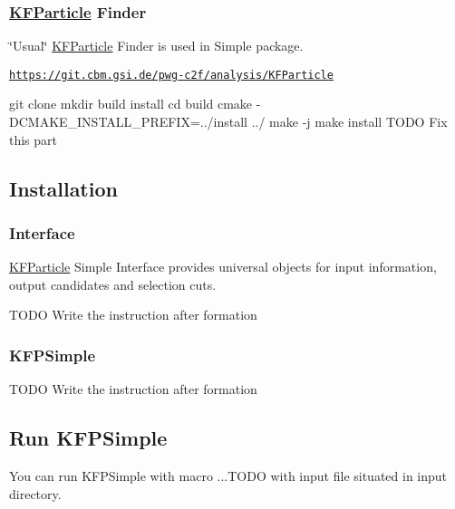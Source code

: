 \subsubsection*{\hyperlink{classKFParticle}{K\+F\+Particle} Finder}

\char`\"{}\+Usual\char`\"{} \hyperlink{classKFParticle}{K\+F\+Particle} Finder is used in Simple package.

\href{https://git.cbm.gsi.de/pwg-c2f/analysis/KFParticle}{\tt https\+://git.\+cbm.\+gsi.\+de/pwg-\/c2f/analysis/\+K\+F\+Particle} \begin{DoxyVerb}git clone
mkdir build install
cd build
cmake -DCMAKE_INSTALL_PREFIX=../install ../
make -j
make install                              TODO Fix this part
\end{DoxyVerb}


\subsection*{Installation}

\subsubsection*{Interface}

\hyperlink{classKFParticle}{K\+F\+Particle} Simple Interface provides universal objects for input information, output candidates and selection cuts. \begin{DoxyVerb}                                          TODO Write the instruction after formation
\end{DoxyVerb}


\subsubsection*{K\+F\+P\+Simple}

\begin{DoxyVerb}                                          TODO Write the instruction after formation
\end{DoxyVerb}


\subsection*{Run K\+F\+P\+Simple}

You can run K\+F\+P\+Simple with macro ...T\+O\+DO with input file situated in input directory. 